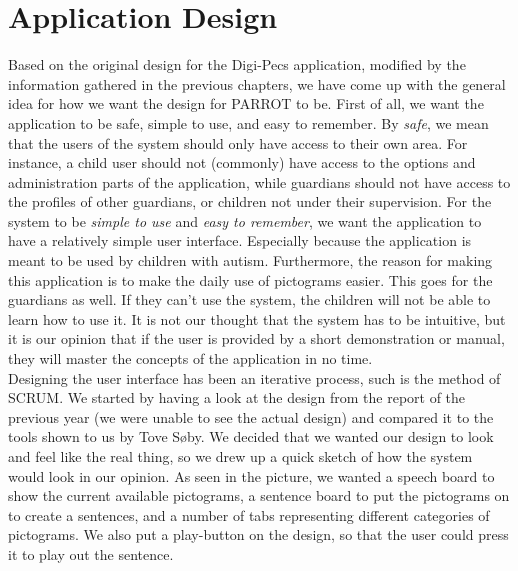 \chapter{Application Design}
Based on the original design for the Digi-Pecs application, modified by the information gathered in the previous chapters, we have come up with the general idea for how we want the design for PARROT to be.\newline
First of all, we want the application to be safe, simple to use, and easy to remember.\newline
By \textit{safe}, we mean that the users of the system should only have access to their own area. For instance, a child user should not (commonly) have access to the options and administration parts of the application, while guardians should not have access to the profiles of other guardians, or children not under their supervision.\newline
For the system to be \textit{simple to use} and \textit{easy to remember}, we want the application to have a relatively simple user interface. Especially because the application is meant to be used by children with autism. Furthermore, the reason for making this application is to make the daily use of pictograms easier. This goes for the guardians as well. If they can't use the system, the children will not be able to learn how to use it.\newline
It is not our thought that the system has to be intuitive, but it is our opinion that if the user is provided by a short demonstration or manual, they will master the concepts of the application in no time.\newline
\\
Designing the user interface has been an iterative process, such is the method of SCRUM. We started by having a look at the design from the report of the previous year (we were unable to see the actual design) and compared it to the tools shown to us by Tove S\o{}by.%
We decided that we wanted our design to look and feel like the real thing, so we drew up a quick sketch of how the system would look in our opinion.\newline
As seen in the picture, we wanted a speech board to show the current available pictograms, a sentence board to put the pictograms on to create a sentences, and a number of tabs representing different categories of pictograms. We also put a play-button on the design, so that the user could press it to play out the sentence.\newline
